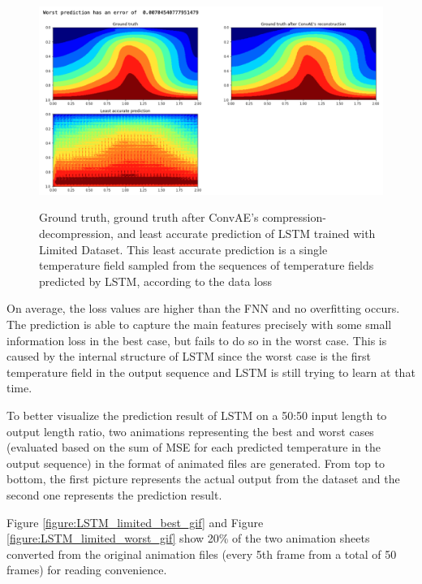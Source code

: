 \begin{figure}[H]
    \caption{Ground truth, ground truth after ConvAE's compression-decompression, and least accurate prediction of LSTM trained with Limited Dataset. This least accurate prediction is a single temperature field sampled from the sequences of temperature fields predicted by LSTM, according to the data loss}
    \includegraphics[scale=0.5]{figures/mantle_convection_images/limited_dataset/LSTM_Worst.png}
    \label{figure:LSTM_limited_worst}
\end{figure}

On average, the loss values are higher than the FNN and no overfitting occurs. The prediction is able to capture the main features precisely with some small information loss in the best case, but fails to do so in the worst case. This is caused by the internal structure of LSTM since the worst case is the first temperature field in the output sequence and LSTM is still trying to learn at that time.

To better visualize the prediction result of LSTM on a 50:50 input length to output length ratio, two animations representing the best and worst cases (evaluated based on the sum of MSE for each predicted temperature in the output sequence) in the format of animated files are generated. From top to bottom, the first picture represents the actual output from the dataset and the second one represents the prediction result.

Figure \ref{figure:LSTM_limited_best_gif} and Figure \ref{figure:LSTM_limited_worst_gif} show 20\% of the two animation sheets converted from the original animation files (every 5th frame from a total of 50 frames) for reading convenience.


